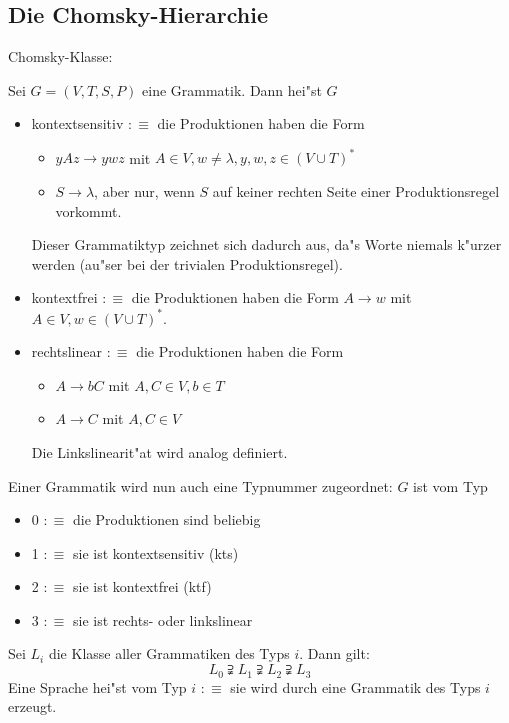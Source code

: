 \subsection{Die Chomsky-Hierarchie}
\label{sub:chomsky}
 Chomsky-Klasse:{
  Sei $G=(V,T,S,P)$ eine Grammatik. Dann hei"st $G$
  \begin{itemize}
    \item kontextsensitiv  $:\equiv$
      die Produktionen haben die Form
      \begin{itemize}
        \item $yAz \to ywz$ mit $A\in V,w\ne\lambda,y,w,z\in(V\cup T)^*$ 
        \item $S\to\lambda$, aber nur, wenn $S$ auf keiner rechten
          Seite einer Produktionsregel vorkommt.
        \end{itemize}
      Dieser Grammatiktyp zeichnet sich dadurch aus, da"s Worte niemals
      k"urzer werden (au"ser bei der trivialen Produktionsregel).
    \item kontextfrei  $:\equiv$
      die Produktionen haben die Form $A\to w$ mit $A\in V,w\in(V\cup T)^*$.
    \item rechtslinear  $:\equiv$
      die Produktionen haben die Form
      \begin{itemize}
        \item $A \to bC$ mit $A,C\in V,b\in T$
        \item $A \to C$ mit $A,C\in V$
        \end{itemize}
      Die Linkslinearit"at wird analog definiert.
    \end{itemize}
  Einer Grammatik wird nun auch eine Typnummer zugeordnet: $G$ ist 
  vom Typ
  \begin{itemize}
    \item 0 $:\equiv$ die Produktionen sind beliebig
    \item 1 $:\equiv$ sie ist kontextsensitiv (kts)
    \item 2 $:\equiv$ sie ist kontextfrei (ktf) 
    \item 3 $:\equiv$ sie ist rechts- oder linkslinear
    \end{itemize}
  Sei $L_i$ die Klasse aller Grammatiken des Typs $i$. Dann gilt:
  \[L_0 \supsetneqq L_1 \supsetneqq L_2 \supsetneqq L_3
    \]
  Eine Sprache hei"st vom Typ $i$ $:\equiv$ sie wird durch eine 
  Grammatik des Typs $i$ erzeugt.
  }
